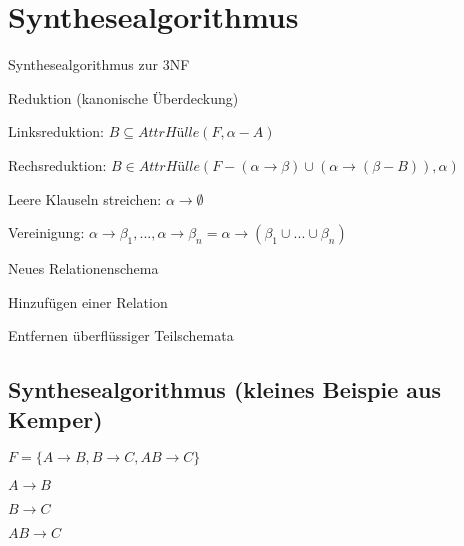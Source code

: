 \documentclass{lehramt-informatik-haupt}
\begin{document}
\chapter{Synthesealgorithmus}

\begin{lernkartei}{Synthesealgorithmus zur 3NF}

\begin{compactenum}
\item Reduktion (kanonische Überdeckung)

\begin{compactenum}
\item Linksreduktion:
$B \subseteq \textit{AttrHülle}(F, \alpha - A)$

\item Rechsreduktion:
$B \in \textit{AttrHülle}(F - (\alpha \rightarrow \beta) \cup (\alpha \rightarrow (\beta - B)), \alpha)$

\item Leere Klauseln streichen:
$\alpha \rightarrow \emptyset$

\item Vereinigung:
$\alpha \rightarrow \beta_1,...,\alpha \rightarrow \beta_n  = \alpha \rightarrow (\beta_1 \cup ... \cup \beta_n)$
\end{compactenum}

\item Neues Relationenschema
\item Hinzufügen einer Relation
\item Entfernen überflüssiger Teilschemata
\end{compactenum}
\end{lernkartei}

%

\section{Synthesealgorithmus (kleines Beispie aus Kemper)}

\cite[Seite 186]{kemper}

$F = \{A \rightarrow B, B \rightarrow C, AB \rightarrow C\}$

\begin{compactitem}
\item $A \rightarrow B$
\item $B \rightarrow C$
\item $AB \rightarrow C$
\end{compactitem}
\end{document}
